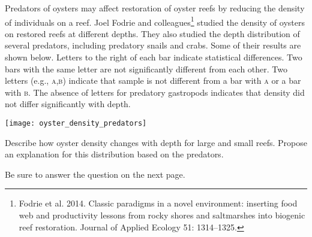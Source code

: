 Predators of oysters may affect restoration of oyster reefs by reducing the density of individuals on a reef. Joel Fodrie and colleagues\footnote{Fodrie et al. 2014. Classic paradigms in a novel environment: inserting food web and productivity lessons from rocky shores and saltmarshes into biogenic reef restoration. Journal of Applied Ecology 51: 1314--1325.} studied the density of oysters on restored reefs at different depths. They also studied the depth distribution of several predators, including predatory snails and crabs. Some of their results are shown below. Letters to the right of each bar indicate statistical differences. Two bars with the same letter are not significantly different from each other. Two letters (e.g., \textsc{a,b}) indicate that sample is not different from a bar with \textsc{a} or a bar with \textsc{b}. The absence of letters for predatory gastropods indicates that density did not differ significantly with depth.

\texttt{[image: oyster\_density\_predators]}

\question[5]\label{question:project}
Describe how oyster density changes with depth for large and small reefs. Propose an explanation for this distribution based on the predators.


{\footnotesize Be sure to answer the question on the next page.}

\newpage
